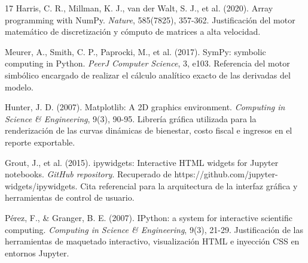 \documentclass[12pt, a4paper]{article}
\begin{document}
\begin{thebibliography}{17}
Harris, C. R., Millman, K. J., van der Walt, S. J., et al. (2020). Array programming with NumPy. \textit{Nature}, 585(7825), 357-362. Justificación del motor matemático de discretización y cómputo de matrices a alta velocidad.

Meurer, A., Smith, C. P., Paprocki, M., et al. (2017). SymPy: symbolic computing in Python. \textit{PeerJ Computer Science}, 3, e103. Referencia del motor simbólico encargado de realizar el cálculo analítico exacto de las derivadas del modelo.

Hunter, J. D. (2007). Matplotlib: A 2D graphics environment. \textit{Computing in Science \& Engineering}, 9(3), 90-95. Librería gráfica utilizada para la renderización de las curvas dinámicas de bienestar, costo fiscal e ingresos en el reporte exportable.

Grout, J., et al. (2015). ipywidgets: Interactive HTML widgets for Jupyter notebooks. \textit{GitHub repository}. Recuperado de https://github.com/jupyter-widgets/ipywidgets. Cita referencial para la arquitectura de la interfaz gráfica y herramientas de control de usuario.

Pérez, F., \& Granger, B. E. (2007). IPython: a system for interactive scientific computing. \textit{Computing in Science \& Engineering}, 9(3), 21-29. Justificación de las herramientas de maquetado interactivo, visualización HTML e inyección CSS en entornos Jupyter.

\end{thebibliography}
\end{document}
